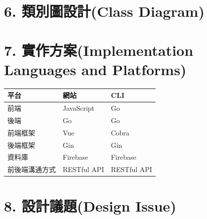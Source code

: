 \documentclass{report}
\begin{document}
\section*{6. 類別圖設計(Class Diagram)}


\section*{7. 實作方案(Implementation Languages and Platforms)}

\begin{center}
	\begin{tabular}{|l|l|l|}
		\hline
		平台 & 網站 & CLI \\ \hline
		前端 & JavaScript & Go \\ \hline
		後端 & Go & Go \\ \hline
		前端框架 & Vue & Cobra \\ \hline	
		後端框架 & Gin & Gin \\ \hline
		資料庫 & Firebase & Firebase \\ \hline
		前後端溝通方式 & RESTful API & RESTful API \\ \hline
	\end{tabular}
\end{center}

\section*{8. 設計議題(Design Issue)}
\end{document}
